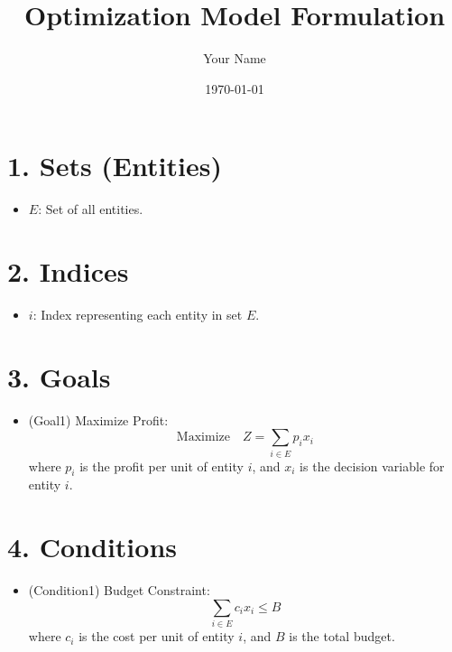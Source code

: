 \documentclass[a4paper,12pt]{article}
\title{Optimization Model Formulation}
\author{Your Name}
\date{\today}
\begin{document}
\maketitle

\tableofcontents
\newpage

\section{1. Sets (Entities)}
\begin{itemize}
    \item $E$: Set of all entities.
\end{itemize}

\section{2. Indices}
\begin{itemize}
    \item $i$: Index representing each entity in set $E$.
\end{itemize}

\section{3. Goals}
\begin{itemize}
    \item (Goal1) Maximize Profit:
    \[
    \text{Maximize} \quad Z = \sum_{i \in E} p_i x_i
    \]
    where $p_i$ is the profit per unit of entity $i$, and $x_i$ is the decision variable for entity $i$.
    
\end{itemize}

\section{4. Conditions}
\begin{itemize}
    \item (Condition1) Budget Constraint:
    \[
    \sum_{i \in E} c_i x_i \leq B
    \]
    where $c_i$ is the cost per unit of entity $i$, and $B$ is the total budget.
    
\end{itemize}
\end{document}
